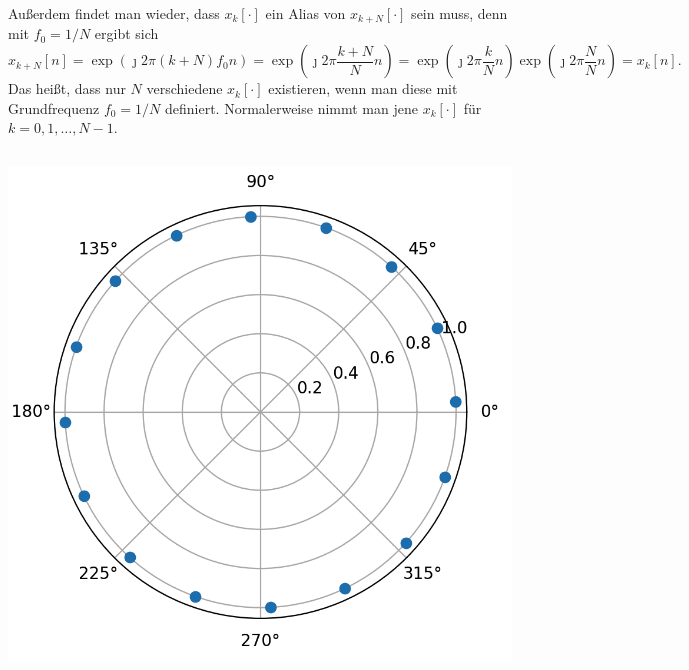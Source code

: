 Außerdem findet man wieder, dass $x_k[\cdot]$ ein Alias von $x_{k+N}[\cdot]$ sein muss, denn mit $f_0 = 1/N$ ergibt sich
\[
 x_{k+N}[n] = \exp\left(
        \jmath 2 \pi (k + N) f_0 n
    \right)
    = \exp\left(
        \jmath 2 \pi \frac{k + N}{N} n
    \right)
    = \exp\left(
        \jmath 2 \pi \frac{k}{N} n
    \right) 
    \exp\left(
        \jmath 2 \pi \frac NN n
    \right) 
    = x_k[n].
\]
Das heißt, dass nur $N$ verschiedene $x_k[\cdot]$ existieren, wenn man diese mit Grundfrequenz $f_0 = 1/N$ definiert.
Normalerweise nimmt man jene $x_k[\cdot]$ für $k = 0, 1, \ldots, N-1$.
%
\begin{listing}
    \noindent
    \begin{minipage}{0.49\textwidth}
        \strut\vspace*{-\baselineskip}\newline
        \inputminted[firstline=4]{python3}{code/disc_harms_comp.py}
    \end{minipage}%
    \begin{minipage}{0.3\textwidth}
        \strut\vspace*{-\baselineskip}\newline
        \includegraphics[width=\textwidth]{code/disc_harms_comp.png}


\end{minipage}
\end{listing}

